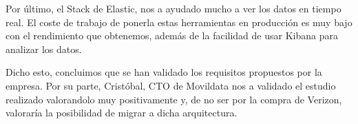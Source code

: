 Por último, el Stack de Elastic, nos a ayudado mucho a ver los datos en tiempo real. El coste de trabajo de ponerla estas herramientas en producción es muy bajo con el rendimiento que obtenemos, además de la facilidad de usar Kibana para analizar los datos. \par

Dicho esto, concluimos que se han validado los requisitos propuestos por la empresa. Por su parte, Cristóbal, CTO de Movildata nos a validado el estudio realizado valorandolo muy positivamente y, de no ser por la compra de Verizon, valoraría la posibilidad de migrar a dicha arquitectura.